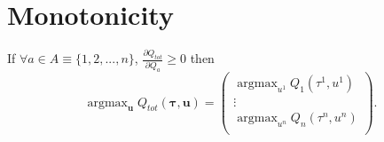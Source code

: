 \documentclass[twoside,11pt]{article}
\DeclareMathOperator*{\argmax}{argmax}
\begin{document}
\section{Monotonicity}
\label{appendix:monotonicity}
	\label{proof:mon}
	\begin{theorem} 
		If $\forall a \in A \equiv\{1, 2, ..., n\}$, $\frac{\partial Q_{tot}}{\partial Q_a}  \geq 0$ then
		\begin{equation}
		\nonumber
		\argmax_{\mathbf{u}}Q_{tot}(\boldsymbol{\tau}, \mathbf{u}) = 
		\begin{pmatrix}
		\argmax_{u^1}Q_1(\tau^1, u^1)   \\
		\vdots \\
		\argmax_{u^n}Q_n(\tau^n, u^n) \\
		\end{pmatrix}.
		\end{equation}
	\end{theorem}
\end{document}
